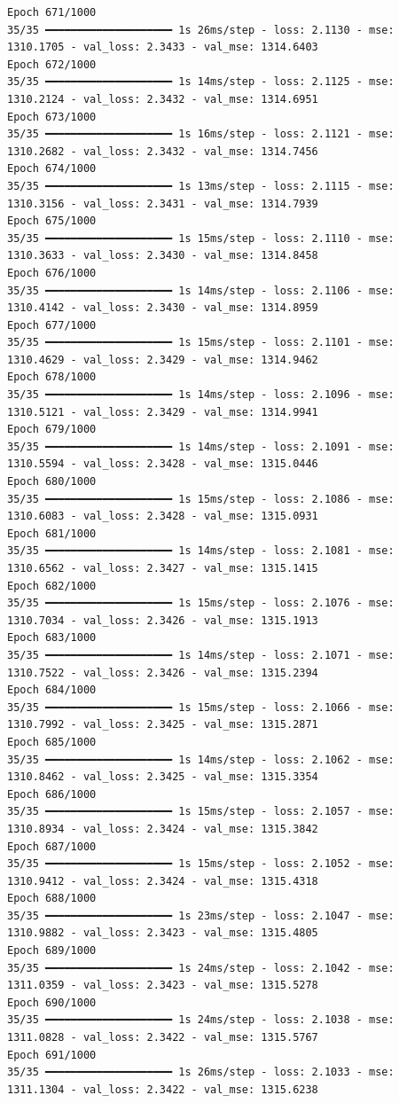 \documentclass[
  letterpaper,
  DIV=11,
  numbers=noendperiod]{scrreprt}
\begin{document}
\begin{verbatim}
Epoch 671/1000
35/35 ━━━━━━━━━━━━━━━━━━━━ 1s 26ms/step - loss: 2.1130 - mse: 1310.1705 - val_loss: 2.3433 - val_mse: 1314.6403
Epoch 672/1000
35/35 ━━━━━━━━━━━━━━━━━━━━ 1s 14ms/step - loss: 2.1125 - mse: 1310.2124 - val_loss: 2.3432 - val_mse: 1314.6951
Epoch 673/1000
35/35 ━━━━━━━━━━━━━━━━━━━━ 1s 16ms/step - loss: 2.1121 - mse: 1310.2682 - val_loss: 2.3432 - val_mse: 1314.7456
Epoch 674/1000
35/35 ━━━━━━━━━━━━━━━━━━━━ 1s 13ms/step - loss: 2.1115 - mse: 1310.3156 - val_loss: 2.3431 - val_mse: 1314.7939
Epoch 675/1000
35/35 ━━━━━━━━━━━━━━━━━━━━ 1s 15ms/step - loss: 2.1110 - mse: 1310.3633 - val_loss: 2.3430 - val_mse: 1314.8458
Epoch 676/1000
35/35 ━━━━━━━━━━━━━━━━━━━━ 1s 14ms/step - loss: 2.1106 - mse: 1310.4142 - val_loss: 2.3430 - val_mse: 1314.8959
Epoch 677/1000
35/35 ━━━━━━━━━━━━━━━━━━━━ 1s 15ms/step - loss: 2.1101 - mse: 1310.4629 - val_loss: 2.3429 - val_mse: 1314.9462
Epoch 678/1000
35/35 ━━━━━━━━━━━━━━━━━━━━ 1s 14ms/step - loss: 2.1096 - mse: 1310.5121 - val_loss: 2.3429 - val_mse: 1314.9941
Epoch 679/1000
35/35 ━━━━━━━━━━━━━━━━━━━━ 1s 14ms/step - loss: 2.1091 - mse: 1310.5594 - val_loss: 2.3428 - val_mse: 1315.0446
Epoch 680/1000
35/35 ━━━━━━━━━━━━━━━━━━━━ 1s 15ms/step - loss: 2.1086 - mse: 1310.6083 - val_loss: 2.3428 - val_mse: 1315.0931
Epoch 681/1000
35/35 ━━━━━━━━━━━━━━━━━━━━ 1s 14ms/step - loss: 2.1081 - mse: 1310.6562 - val_loss: 2.3427 - val_mse: 1315.1415
Epoch 682/1000
35/35 ━━━━━━━━━━━━━━━━━━━━ 1s 15ms/step - loss: 2.1076 - mse: 1310.7034 - val_loss: 2.3426 - val_mse: 1315.1913
Epoch 683/1000
35/35 ━━━━━━━━━━━━━━━━━━━━ 1s 14ms/step - loss: 2.1071 - mse: 1310.7522 - val_loss: 2.3426 - val_mse: 1315.2394
Epoch 684/1000
35/35 ━━━━━━━━━━━━━━━━━━━━ 1s 15ms/step - loss: 2.1066 - mse: 1310.7992 - val_loss: 2.3425 - val_mse: 1315.2871
Epoch 685/1000
35/35 ━━━━━━━━━━━━━━━━━━━━ 1s 14ms/step - loss: 2.1062 - mse: 1310.8462 - val_loss: 2.3425 - val_mse: 1315.3354
Epoch 686/1000
35/35 ━━━━━━━━━━━━━━━━━━━━ 1s 15ms/step - loss: 2.1057 - mse: 1310.8934 - val_loss: 2.3424 - val_mse: 1315.3842
Epoch 687/1000
35/35 ━━━━━━━━━━━━━━━━━━━━ 1s 15ms/step - loss: 2.1052 - mse: 1310.9412 - val_loss: 2.3424 - val_mse: 1315.4318
Epoch 688/1000
35/35 ━━━━━━━━━━━━━━━━━━━━ 1s 23ms/step - loss: 2.1047 - mse: 1310.9882 - val_loss: 2.3423 - val_mse: 1315.4805
Epoch 689/1000
35/35 ━━━━━━━━━━━━━━━━━━━━ 1s 24ms/step - loss: 2.1042 - mse: 1311.0359 - val_loss: 2.3423 - val_mse: 1315.5278
Epoch 690/1000
35/35 ━━━━━━━━━━━━━━━━━━━━ 1s 24ms/step - loss: 2.1038 - mse: 1311.0828 - val_loss: 2.3422 - val_mse: 1315.5767
Epoch 691/1000
35/35 ━━━━━━━━━━━━━━━━━━━━ 1s 26ms/step - loss: 2.1033 - mse: 1311.1304 - val_loss: 2.3422 - val_mse: 1315.6238

\end{verbatim}
\end{document}
